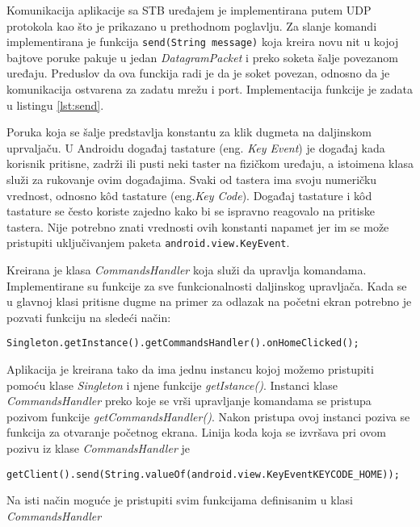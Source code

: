 \documentclass[struktura.tex]{subfiles}
\begin{document}
Komunikacija aplikacije sa STB uređajem je implementirana putem UDP protokola kao što je prikazano u prethodnom poglavlju. Za slanje komandi implementirana je funkcija \verb|send(String message)| koja kreira novu nit u kojoj bajtove poruke pakuje u jedan \textit{DatagramPacket} \cite{sajt:datagram} i preko soketa šalje povezanom uređaju. Preduslov da ova funckija radi je da je soket povezan, odnosno da je komunikacija ostvarena za zadatu mrežu i port. Implementacija funkcije je zadata u listingu \ref{lst:send}.



Poruka koja se šalje predstavlja konstantu za klik dugmeta na daljinskom uprvaljaču. U Androidu događaj tastature (eng. \textit{Key Event}) je događaj kada korisnik pritisne, zadrži ili pusti neki taster na fizičkom uređaju, a istoimena klasa služi za rukovanje ovim događajima. Svaki od tastera ima svoju numeričku vrednost, odnosno k\^{o}d tastature (eng.\textit{Key Code}). Događaj tastature i k\^{o}d tastature se često koriste zajedno kako bi se ispravno reagovalo na pritiske tastera. Nije potrebno znati vrednosti ovih konstanti napamet jer im se može pristupiti uključivanjem paketa \verb|android.view.KeyEvent|. 

Kreirana je klasa \textit{CommandsHandler} koja služi da upravlja komandama. Implementirane su funkcije za sve funkcionalnosti daljinskog upravljača. Kada se u glavnoj klasi pritisne dugme na primer za odlazak na početni ekran potrebno je pozvati funkciju na sledeći način: 

\verb|Singleton.getInstance().getCommandsHandler().onHomeClicked();|

Aplikacija je kreirana tako da ima jednu instancu kojoj možemo pristupiti pomoću klase \textit{Singleton} i njene funkcije \textit{getIstance()}. Instanci klase \textit{CommandsHandler} preko koje se vrši upravljanje komandama se pristupa pozivom funkcije \textit{getCommandsHandler()}. Nakon pristupa ovoj instanci poziva se funkcija za otvaranje početnog ekrana. Linija koda koja se izvršava pri ovom pozivu iz klase \textit{CommandsHandler} je 

\verb|getClient().send(String.valueOf(android.view.KeyEventKEYCODE_HOME));|

Na isti način moguće je pristupiti svim funkcijama definisanim u klasi \textit{CommandsHandler}
\end{document}
